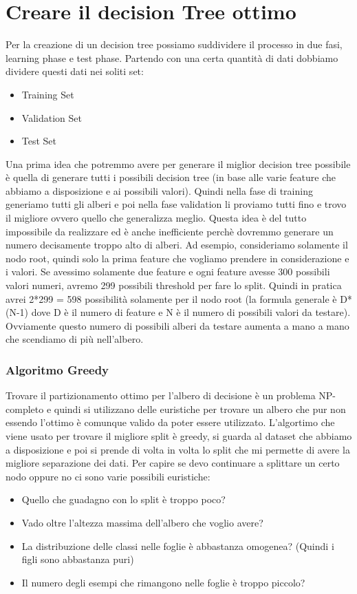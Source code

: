 \documentclass[14pt]{extreport}
\begin{document}
\section{Creare il decision Tree ottimo}

Per la creazione di un decision tree possiamo suddividere il processo in due fasi, learning phase e test phase. Partendo con una certa quantità di
dati dobbiamo dividere questi dati nei soliti set:
\begin{itemize}
	\item Training Set
	\item Validation Set
	\item Test Set

\end{itemize}

Una prima idea che potremmo avere per generare il miglior decision tree possibile è quella di generare tutti i possibili decision tree (in base alle
varie feature che abbiamo a disposizione e ai possibili valori). Quindi nella fase di training generiamo tutti gli alberi e poi nella fase validation
li proviamo tutti fino e trovo il migliore ovvero quello che generalizza meglio. Questa idea è del tutto impossibile da realizzare ed è anche
inefficiente perchè dovremmo generare un numero decisamente troppo alto di alberi. Ad esempio, consideriamo solamente il nodo root, quindi solo la
prima feature che vogliamo prendere in considerazione e i valori. Se avessimo solamente due feature e ogni feature avesse 300 possibili valori numeri,
avremo 299 possibili threshold per fare lo split. Quindi in pratica avrei 2*299 = 598 possibilità solamente per il nodo root (la formula generale è
D*(N-1) dove D è il numero di feature e N è il numero di possibili valori da testare). Ovviamente questo numero di possibili alberi da testare aumenta
a mano a mano che scendiamo di più nell’albero.

\subsubsection{Algoritmo Greedy}

Trovare il partizionamento ottimo per l’albero di decisione è un problema NP-completo e quindi si utilizzano delle euristiche per trovare un albero
che pur non essendo l’ottimo è comunque valido da poter essere utilizzato. L’algortimo che viene usato per trovare il migliore split è greedy, si
guarda al dataset che abbiamo a disposizione e poi si prende di volta in volta lo split che mi permette di avere la migliore separazione dei dati. Per
capire se devo continuare a splittare un certo nodo oppure no ci sono varie possibili euristiche:
\begin{itemize}
	\item Quello che guadagno con lo split è troppo poco?
	\item Vado oltre l’altezza massima dell’albero che voglio avere?
	\item La distribuzione delle classi nelle foglie è abbastanza omogenea? (Quindi i figli sono abbastanza puri)
	\item Il numero degli esempi che rimangono nelle foglie è troppo piccolo?
\end{itemize}
\end{document}
